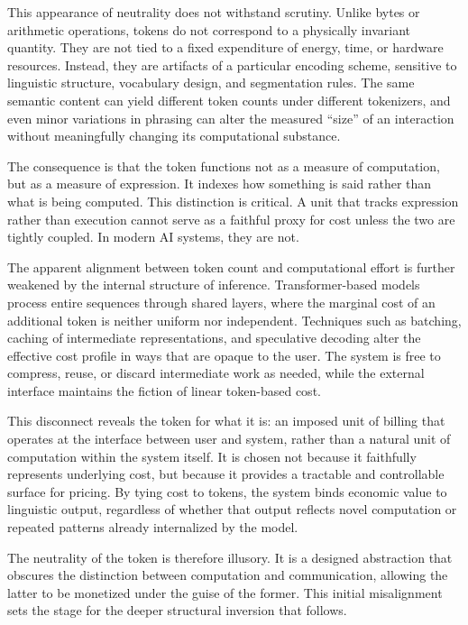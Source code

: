 \documentclass[12pt, oneside]{article}
\begin{document}
This appearance of neutrality does not withstand scrutiny. Unlike bytes or arithmetic operations, tokens do not correspond to a physically invariant quantity. They are not tied to a fixed expenditure of energy, time, or hardware resources. Instead, they are artifacts of a particular encoding scheme, sensitive to linguistic structure, vocabulary design, and segmentation rules. The same semantic content can yield different token counts under different tokenizers, and even minor variations in phrasing can alter the measured ``size'' of an interaction without meaningfully changing its computational substance.

The consequence is that the token functions not as a measure of computation, but as a measure of expression. It indexes how something is said rather than what is being computed. This distinction is critical. A unit that tracks expression rather than execution cannot serve as a faithful proxy for cost unless the two are tightly coupled. In modern AI systems, they are not.

The apparent alignment between token count and computational effort is further weakened by the internal structure of inference. Transformer-based models process entire sequences through shared layers, where the marginal cost of an additional token is neither uniform nor independent. Techniques such as batching, caching of intermediate representations, and speculative decoding alter the effective cost profile in ways that are opaque to the user. The system is free to compress, reuse, or discard intermediate work as needed, while the external interface maintains the fiction of linear token-based cost.

This disconnect reveals the token for what it is: an imposed unit of billing that operates at the interface between user and system, rather than a natural unit of computation within the system itself. It is chosen not because it faithfully represents underlying cost, but because it provides a tractable and controllable surface for pricing. By tying cost to tokens, the system binds economic value to linguistic output, regardless of whether that output reflects novel computation or repeated patterns already internalized by the model.

The neutrality of the token is therefore illusory. It is a designed abstraction that obscures the distinction between computation and communication, allowing the latter to be monetized under the guise of the former. This initial misalignment sets the stage for the deeper structural inversion that follows.
\end{document}
